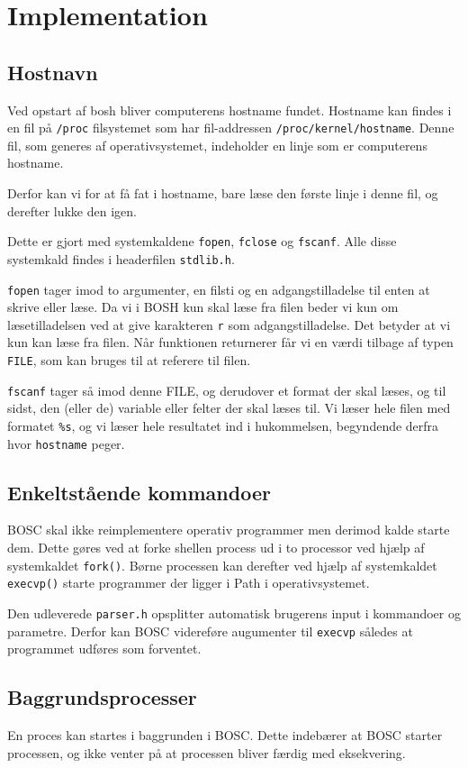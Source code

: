 \section{Implementation}
\subsection{Hostnavn}
Ved opstart af bosh bliver computerens hostname fundet. Hostname kan findes i en fil på \texttt{/proc} filsystemet som har fil-addressen \texttt{/proc/kernel/hostname}. Denne fil, som generes af operativsystemet, indeholder en linje som er computerens hostname.

Derfor kan vi for at få fat i hostname, bare læse den første linje i denne fil, og derefter lukke den igen.

Dette er gjort med systemkaldene \texttt{fopen}, \texttt{fclose} og \texttt{fscanf}. Alle disse systemkald findes i headerfilen \texttt{stdlib.h}.

\texttt{fopen} tager imod to argumenter, en filsti og en adgangstilladelse til enten at skrive eller læse. Da vi i BOSH kun skal læse fra filen beder vi kun om læsetilladelsen ved at give karakteren \texttt{r} som adgangstilladelse. Det betyder at vi kun kan læse fra filen. Når funktionen returnerer får vi en værdi tilbage af typen \texttt{FILE}, som kan bruges til at referere til filen.

\texttt{fscanf} tager så imod denne FILE, og derudover et format der skal læses, og til sidst, den (eller de) variable eller felter der skal læses til. Vi læser hele filen med formatet \texttt{\%s}, og vi læser hele resultatet ind i hukommelsen, begyndende derfra hvor \texttt{hostname} peger.

\subsection{Enkeltstående kommandoer}
BOSC skal ikke reimplementere operativ programmer men derimod kalde starte dem. Dette gøres ved at forke shellen process ud i to processor ved hjælp af systemkaldet \verb+fork()+. Børne processen kan derefter ved hjælp af systemkaldet \verb+execvp()+ starte programmer der ligger i Path i operativsystemet. 

Den udleverede \verb+parser.h+ opsplitter automatisk brugerens input i kommandoer og parametre. Derfor kan BOSC videreføre augumenter til \verb+execvp+ således at programmet udføres som forventet.
\subsection{Baggrundsprocesser}
En proces kan startes i baggrunden i BOSC. Dette indebærer at BOSC starter processen, og ikke venter på at processen bliver færdig med eksekvering. 

